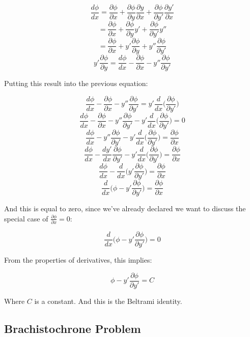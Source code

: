 \documentclass{article}
\begin{document}
$$\frac{ d\phi }{ dx } = \frac{ \partial \phi }{ \partial x } + \frac{ \partial \phi }{ \partial y } \frac{ \partial y }{ \partial x } + \frac{ \partial \phi }{ \partial y' } \frac{ \partial y' }{ \partial x }$$
$$ = \frac{ \partial \phi }{ \partial x } + \frac{ \partial \phi }{ \partial y } y' + \frac{ \partial \phi }{ \partial y' } y''$$
$$ = \frac{ \partial \phi }{ \partial x } + y' \frac{ \partial \phi }{ \partial y } + y'' \frac{ \partial \phi }{ \partial y' }$$
$$y' \frac{ \partial \phi }{ \partial y } = \frac{ d\phi }{ dx } - \frac{ \partial \phi }{ \partial x } - y'' \frac{ \partial \phi }{ \partial y' }$$

Putting this result into the previous equation:

$$\frac{ d\phi }{ dx } - \frac{ \partial \phi }{ \partial x } - y'' \frac{ \partial \phi }{ \partial y' } = y' \frac{ d }{ dx } \Big( \frac{ \partial \phi }{ \partial y' } \Big)$$
$$\frac{ d\phi }{ dx } - \frac{ \partial \phi }{ \partial x } - y'' \frac{ \partial \phi }{ \partial y' } - y' \frac{ d }{ dx } \Big( \frac{ \partial \phi }{ \partial y' } \Big) = 0$$
$$\frac{ d\phi }{ dx } - y'' \frac{ \partial \phi }{ \partial y' } - y' \frac{ d }{ dx } \Big( \frac{ \partial \phi }{ \partial y' } \Big) = \frac{ \partial \phi }{ \partial x }$$
$$\frac{ d\phi }{ dx } - \frac{ dy' }{ dx } \frac{ \partial \phi }{ \partial y' } - y' \frac{ d }{ dx } \Big( \frac{ \partial \phi }{ \partial y' } \Big) = \frac{ \partial \phi }{ \partial x }$$
$$\frac{ d\phi }{ dx } - \frac{ d }{ dx } \Big( y' \frac{ \partial \phi }{ \partial y' } \Big) = \frac{ \partial \phi }{ \partial x }$$
$$\frac{ d }{ dx } \Big( \phi - y' \frac{ \partial \phi }{ \partial y' } \Big) = \frac{ \partial \phi }{ \partial x }$$

And this is equal to zero, since we've already declared we want to discuss the special case of $\frac{ \partial \phi }{ \partial x } = 0$:

$$\frac{ d }{ dx } \Big( \phi - y' \frac{ \partial \phi }{ \partial y' } \Big) = 0$$

From the properties of derivatives, this implies:

\begin{equation}
\phi - y' \frac{ \partial \phi }{ \partial y' } = C
\end{equation}

Where $C$ is a constant.  And this is the Beltrami identity.




%
%
%
\subsection{Brachistochrone Problem}
\end{document}
